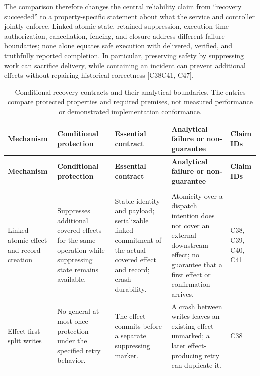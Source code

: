 \documentclass[11pt]{article}
\begin{document}
The comparison therefore changes the central reliability claim from \textquotedblleft{}recovery succeeded\textquotedblright{} to a property-specific statement about what the service and controller jointly enforce. Linked atomic state, retained suppression, execution-time authorization, cancellation, fencing, and closure address different failure boundaries; none alone equates safe execution with delivered, verified, and truthfully reported completion. In particular, preserving safety by suppressing work can sacrifice delivery, while containing an incident can prevent additional effects without repairing historical correctness [C38\textendash{}C41, C47].

\begin{landscape}
\small
\begin{longtable}{@{}>{\raggedright\arraybackslash}p{}>{\raggedright\arraybackslash}p{}>{\raggedright\arraybackslash}p{}>{\raggedright\arraybackslash}p{}>{\raggedright\arraybackslash}p{}@{}}
\caption{Conditional recovery contracts and their analytical boundaries. The entries compare protected properties and required premises, not measured performance or demonstrated implementation conformance.}\\
\toprule
\textbf{Mechanism} & \textbf{Conditional protection} & \textbf{Essential contract} & \textbf{Analytical failure or non-guarantee} & \textbf{Claim IDs}\\
\midrule
\endfirsthead
\toprule
\textbf{Mechanism} & \textbf{Conditional protection} & \textbf{Essential contract} & \textbf{Analytical failure or non-guarantee} & \textbf{Claim IDs}\\
\midrule
\endhead
\midrule
\multicolumn{5}{r}{\footnotesize Continued on next page}\\
\endfoot
\bottomrule
\endlastfoot
Linked atomic effect-and-record creation & Suppresses additional covered effects for the same operation while suppressing state remains available. & Stable identity and payload; serializable linked commitment of the actual covered effect and record; crash durability. & Atomicity over a dispatch intention does not cover an external downstream effect; no guarantee that a first effect or confirmation arrives. & C38, C39, C40, C41\\
Effect-first split writes & No general at-most-once protection under the specified retry behavior. & The effect commits before a separate suppressing marker. & A crash between writes leaves an existing effect unmarked; a later effect-producing retry can duplicate it. & C38\\

\end{longtable}
\end{landscape}
\end{document}
